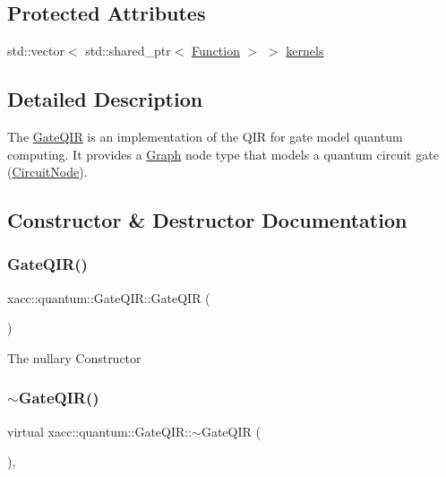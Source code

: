\subsection*{Protected Attributes}
\begin{DoxyCompactItemize}
\item 
std\+::vector$<$ std\+::shared\+\_\+ptr$<$ \hyperlink{a02456}{Function} $>$ $>$ \hyperlink{a01296_ae75a4af0ce455eee1ce316c16426a661}{kernels}
\end{DoxyCompactItemize}


\subsection{Detailed Description}
The \hyperlink{a01296}{Gate\+Q\+IR} is an implementation of the Q\+IR for gate model quantum computing. It provides a \hyperlink{a02528}{Graph} node type that models a quantum circuit gate (\hyperlink{a01292}{Circuit\+Node}). 

\subsection{Constructor \& Destructor Documentation}
\mbox{\label{a01296_afb99f610a6b123538c659169c131a634}} 
\subsubsection{\texorpdfstring{Gate\+Q\+I\+R()}{GateQIR()}}
{\footnotesize\ttfamily xacc\+::quantum\+::\+Gate\+Q\+I\+R\+::\+Gate\+Q\+IR (\begin{DoxyParamCaption}{ }\end{DoxyParamCaption})\hspace{0.3cm}{\ttfamily [inline]}}

The nullary Constructor \mbox{\label{a01296_ac88db03f1dd29e2d36aaa6c01a130008}} 
\subsubsection{\texorpdfstring{$\sim$\+Gate\+Q\+I\+R()}{~GateQIR()}}
{\footnotesize\ttfamily virtual xacc\+::quantum\+::\+Gate\+Q\+I\+R\+::$\sim$\+Gate\+Q\+IR (\begin{DoxyParamCaption}{ }\end{DoxyParamCaption})\hspace{0.3cm}{\ttfamily [inline]}, {\ttfamily [virtual]}}


